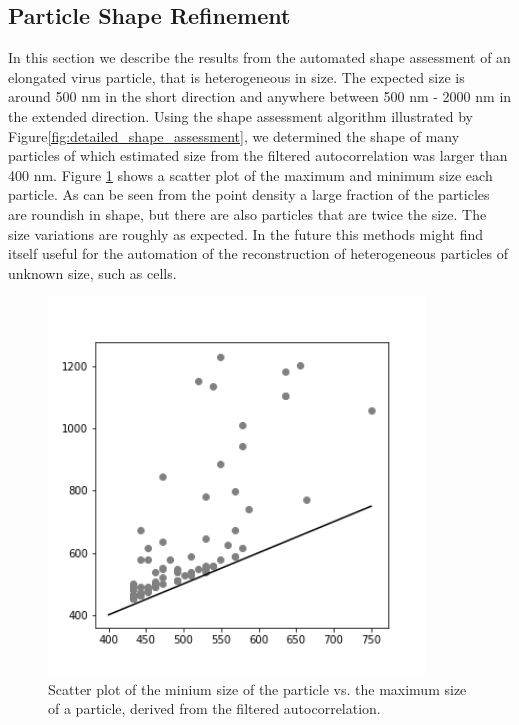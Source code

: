 \subsection{Particle Shape Refinement}

In this section we describe the results from the automated shape assessment of an elongated virus particle, that is heterogeneous in size. The expected size is around 500 nm in the short direction and anywhere between 500 nm - 2000 nm in the extended direction. Using the shape assessment algorithm illustrated by Figure\ref{fig:detailed_shape_assessment}, we determined the shape of many particles of which estimated size from the filtered autocorrelation was larger than 400 nm. Figure \ref{fig:majorminor} shows a scatter plot of the maximum and minimum size each particle. As can be seen from the point density a large fraction of the particles are roundish in shape, but there are also particles that are twice the size. The size variations are roughly as expected. In the future this methods might find itself useful for the automation of the reconstruction of heterogeneous particles of unknown size, such as cells.

\begin{figure}[!h]
\centering
\includegraphics[width=100mm]{Chapter_09_Results_Refined_Sizing.png}
\caption{Scatter plot of the minium size of the particle vs. the maximum size of a particle, derived from the filtered autocorrelation. }\label{fig:majorminor}

\end{figure}




